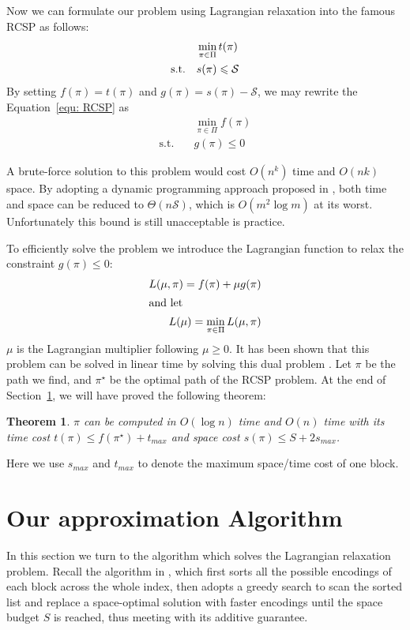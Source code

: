 \documentclass{sig-alternate-05-2015}
\begin{document}
Now we can formulate our problem using Lagrangian relaxation into the famous RCSP as follows:
\begin{align}
 & \min_{\pi \in \Pi} t(\pi) \notag \\
 \text{s.t.}\quad & s(\pi) \leqslant \cal S \label{equ: RCSP}
\end{align}
By setting $ f(\pi) = t(\pi) $ and $ g(\pi) = s(\pi)- \mathcal{S} $, we may rewrite the Equation~\eqref{equ: RCSP} as
\begin{align*}
& \min_{\pi \in \Pi} f(\pi)  \\
\text{s.t.}\quad & g(\pi) \leqslant 0
\end{align*}

A brute-force solution to this problem would cost $ O(n^k) $ time and $ O(nk) $ space.
By adopting a dynamic programming approach proposed in \cite{lawler2001combinatorial}, both time and space can be reduced to $ \Theta(n\mathcal{S}) $, which is $ O(m^{2}\log m) $ at its worst.
Unfortunately this bound is still unacceptable is practice.

To efficiently solve the problem we introduce the Lagrangian function to relax the constraint $ g(\pi) \leqslant 0 $:
\begin{align}
L(\mu,\pi) = f(\pi)+\mu g(\pi) \label{equ: L(u,pi)} \\ 
\intertext{and let}
L(\mu) = \min_{\pi \in \Pi} L(\mu,\pi) \label{equ: L(u)}
\end{align}
\noindent $ \mu $ is the Lagrangian multiplier following $ \mu \geqslant 0 $.
It has been shown that this problem can be solved in linear time by solving this dual problem \cite{handler1980dual}.
Let $ \pi $ be the path we find, and $ \pi^\star $ be the optimal path of the RCSP problem.
At the end of Section~\ref{sec: our alg}, we will have proved the following theorem:
\newtheorem{theorem}{Theorem}
\begin{theorem}
	$ \pi $ can be computed in $ O(\log n) $ time and $ O(n) $ time with its time cost $ t(\pi) \leqslant f(\pi^\star) + t_{max} $ and space cost $ s(\pi) \leqslant S + 2s_{max} $.
\end{theorem}
Here we use $ s_{max} $ and $ t_{max} $ to denote the maximum space/time cost of one block.

\section{Our approximation Algorithm}\label{sec: our alg}
In this section we turn to the algorithm which solves the Lagrangian relaxation problem.
Recall the algorithm in \cite{ottaviano2015optimal}, which first sorts all the possible encodings of each block across the whole index, then adopts a greedy search to scan the sorted list and replace a space-optimal solution with faster encodings until the space budget $ S $ is reached, thus meeting with its additive guarantee.
\end{document}
